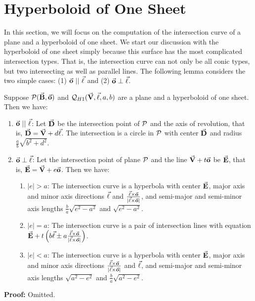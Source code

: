\section{Hyperboloid of One Sheet}
\label{section:hy1}

     In this section, we will focus on the computation of the intersection
curve of a plane and a hyperboloid of one sheet.  We start our discussion with
the hyperboloid of one sheet simply because this surface has the most 
complicated intersection types.  That is, the intersection curve can not only 
be all conic types, but two intersecting as well as parallel lines.  
The following lemma considers the two simple cases: 
(1) $\vec{\bf o}\ ||\ \vec{\bf \ell}$ and 
(2) $\vec{\bf o}\perp\vec{\bf \ell}$.  

\begin{lemma}
\label{lemma:h1-para&perp}
     Suppose ${\cal P}(\vec{\bf B},\vec{\bf o})$ and 
${\cal Q}_{H1}(\vec{\bf V},\vec{\bf \ell},a,b)$ are a plane and a hyperboloid of 
one sheet.  Then we have:
\begin{enumerate}
     \item $\vec{\bf o}\ ||\ \vec{\bf \ell}$:  Let $\vec{\bf D}$ be the intersection
          point of ${\cal P}$ and the axis of revolution, that is, 
          $\vec{\bf D}=\vec{\bf V}+d\vec{\bf \ell}$.  The intersection 
          is a circle in ${\cal P}$ with center $\vec{\bf D}$ and radius 
          $\frac{a}{b}\sqrt{b^2+d^2}$.
     \item $\vec{\bf o}\perp\vec{\bf \ell}$: Let the intersection point of 
          plane ${\cal P}$ and the line $\vec{\bf V}+t\vec{\bf o}$ be $\vec{\bf E}$,
          that is, $\vec{\bf E}=\vec{\bf V}+e\vec{\bf o}$.  
          Then we have:
     \begin{enumerate}
          \item $|e|>a$: The intersection curve is a hyperbola with center
               $\vec{\bf E}$, major axis and minor axis directions $\vec{\bf \ell}$
       and $\frac{\vec{\bf \ell}\times\vec{\bf o}}{|\vec{\bf \ell}\times\vec{\bf o}|}$,
               and semi-major and semi-minor axis lengths 
               $\frac{b}{a}\sqrt{e^2-a^2}$ and $\sqrt{e^2-a^2}$.
          \item $|e|=a$: The intersection curve is a pair of intersection lines
               with equation $\vec{\bf E}+t\left(b\vec{\bf \ell}\pm
           a\frac{\vec{\bf \ell}\times\vec{\bf o}}{|\vec{\bf \ell}\times\vec{\bf o}|}
               \right)$.
          \item $|e|<a$: The intersection curve is a hyperbola with center
               $\vec{\bf E}$, major axis and minor axis directions 
         $\frac{\vec{\bf \ell}\times\vec{\bf o}}{|\vec{\bf \ell}\times\vec{\bf o}|}$
               and $\vec{\bf \ell}$, and semi-major and semi-minor axis
               lengths $\sqrt{a^2-e^2}$ and 
               $\frac{b}{a}\sqrt{a^2-e^2}$.
     \end{enumerate}
\end{enumerate}
\end{lemma}
{\bf Proof:} Omitted. \QED

